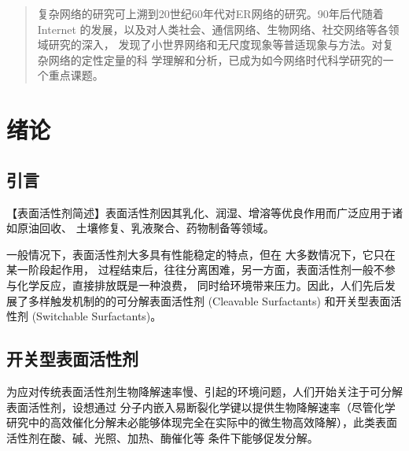 \documentclass[bachelor,fandolfonts,replaceperiod]{jnuthesis} %
\author{陈育明}
\institute{江南大学}
\begin{document}
    \maketitle
    \frontmatter
    \begin{abstract}
        复杂网络的研究可上溯到20世纪60年代对ER网络的研究。90年后代随着Internet
        的发展，以及对人类社会、通信网络、生物网络、社交网络等各领域研究的深入，
        发现了小世界网络和无尺度现象等普适现象与方法。对复杂网络的定性定量的科
        学理解和分析，已成为如今网络时代科学研究的一个重点课题。
    \end{abstract}
    
    \begin{englishabstract}
        \lipsum[1-2]
    \end{englishabstract}
    
    \tableofcontents
    
    \mainmatter
    
    \chapter{绪论}\label{chapter:introduction}
    \section{引言}
    
    【表面活性剂简述】表面活性剂因其乳化、润湿、增溶等优良作用而广泛应用于诸如原油回收、
    土壤修复、乳液聚合、药物制备等领域\cite{秦勇2009}。
    
    一般情况下，表面活性剂大多具有性能稳定的特点，但在    大多数情况下，它只在某一阶段起作用，
    过程结束后，往往分离困难，另一方面，表面活性剂一般不参与化学反应，直接排放既是一种浪费，
    同时给环境带来压力\cite{秦勇2009}。因此，人们先后发展了多样触发机制的的可分解表面活性剂 (Cleavable Surfactants)
    和开关型表面活性剂 (Switchable Surfactants)。
    
    \section{开关型表面活性剂}
    为应对传统表面活性剂生物降解速率慢、引起的环境问题，人们开始关注于可分解表面活性剂，设想通过
    分子内嵌入易断裂化学键以提供生物降解速率（尽管化学研究中的高效催化分解未必能够体现完全在实际中的微生物高效降解），此类表面活性剂在酸、碱、光照、加热、酶催化等
    条件下能够促发分解\cite{hellberg2000}。
    
\end{document}
